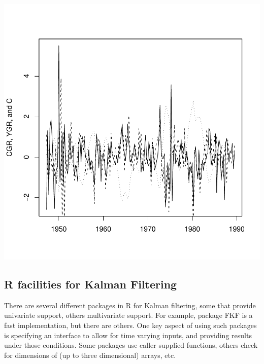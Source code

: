 \documentclass[a4paper]{article}
\renewcommand{\~}{\perispomeni}%
\begin{document}
\begin{center}
\includegraphics{Companion-037}
\end{center}
\subsection{R facilities for Kalman Filtering}
There are several different packages in R for Kalman filtering, some that provide univariate support,
others multivariate support.  For example, package FKF is a fast implementation, but there are others. One key
aspect of using such packages is specifying an interface to allow for time varying inputs, and providing results
under those conditions.  Some packages use caller supplied functions, others check for dimensions of (up to three
dimensional) arrays, etc.
\end{document}

